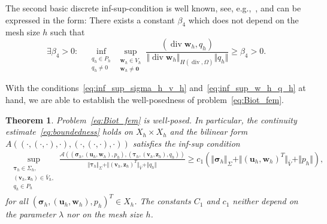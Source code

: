 \documentclass[11pt]{amsart}
\newtheorem{theorem}{Theorem}
\theoremstyle{remark}
\theoremstyle{definition}
\def\sig{{\bm \sigma}}
\def\bu{{\boldsymbol u}}
\def\bv{{\boldsymbol v}}
\def\bw{{\boldsymbol w}}
\def\tsig{\sig}
\def\tbu{{\bu}}
\def\tbw{{\bw}}
\def\tp{{p}}
\renewcommand{\div}{\operatorname{div}}
\renewcommand{\div}{\operatorname{div}}
\def\sig{\boldsymbol \sigma}
\def\bu{\boldsymbol u}
\def\bv{\boldsymbol v}
\def\bw{\boldsymbol w}
\def\bz{\boldsymbol z}
\begin{document}
%
{ The second basic discrete inf-sup-condition is well known, see, e.g.,~\cite{Boffi2013mixed}, and can be expressed in the form: There exists a constant $\beta_4$ which does not depend on the mesh size $h$ such that}
\begin{equation}\label{eq:inf_sup_w_h_q_h}
\exists \beta_{4} > 0: \quad \inf_{\substack{q_h \in P_h \\ q_h \neq 0}} \sup_{\substack{\bw_h \in V_h \\ \bw_h \neq \bm 0}} 
\frac{(\div \bw_h,q_h)}{\Vert \div \bw_h \Vert_{H(\div,\Omega)} \Vert q_h \Vert} \ge \beta_{4} > 0 .
\end{equation} 

With the conditions~\eqref{eq:inf_sup_sigma_h_v_h} and~\eqref{eq:inf_sup_w_h_q_h} at hand, we are able to establish the well-posedness of problem~\eqref{eq:Biot_fem}.
%
\begin{theorem}\label{thm:well-posedness_h}
Problem~\eqref{eq:Biot_fem} is well-posed.
{
In particular, the continuity estimate~\eqref{eq:boundedness} holds on $X_h \times X_h$ and the bilinear form 
$A ((\cdot,(\cdot,\cdot),\cdot),(\cdot,(\cdot,\cdot),\cdot))$ satisfies the inf-sup condition
\begin{align}\label{inf-sup-dis}
\sup_{\substack{\bm \tau_h \in \Sigma_h, \\ (\bv_h,\bz_h)\in \bar{V}_h, \\ q_h\in P_h}}\frac{\mathcal A ((\tsig_h,(\tbu_h,\tbw_h),\tp_h),(\bm \tau_h,(\bv_h,\bz_h),q_h))}{\Vert \bm \tau_h \Vert_\Sigma + \Vert (\bv_h,\bz_h)^T \Vert_{\bar{V}} + \Vert q_h \Vert}\ge c_1 \left(\Vert \tsig_h \Vert_\Sigma + \Vert (\tbu_h,\tbw_h)^T \Vert_{\bar{V}} + \Vert \tp_h \Vert\right),
\end{align}
{ for all  $(\sig_h,(\bu_h,\bw_h),p_h)^T \in X_h$}. The constants $C_1$  and $c_1$ neither depend on the
parameter $\lambda$ nor on the mesh size $h$. 
}
\end{theorem}
%
\end{document}
